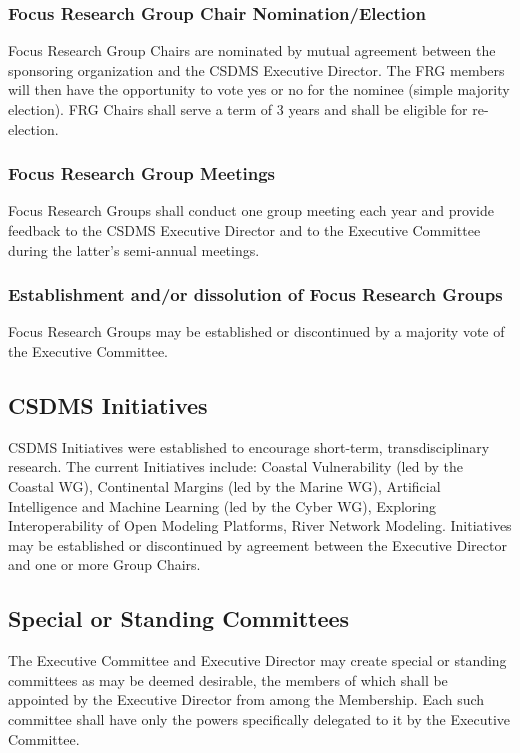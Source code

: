 \documentclass[11pt, oneside]{article}   	%
\begin{document}
\subsubsection{Focus Research Group Chair Nomination/Election}
Focus Research Group Chairs are nominated by mutual agreement between the sponsoring organization and the CSDMS Executive Director. The FRG members will then have the opportunity to vote yes or no for the nominee (simple majority election).  FRG Chairs shall serve a term of 3 years and shall be eligible for re-election.

\subsubsection{Focus Research Group Meetings}

Focus Research Groups shall conduct one group meeting each year and provide feedback to the CSDMS Executive Director and to the Executive Committee during the latter's semi-annual meetings.

\subsubsection{Establishment and/or dissolution of Focus Research Groups}

Focus Research Groups may be established or discontinued by a majority vote of the Executive Committee.  


\subsection{CSDMS Initiatives}

CSDMS Initiatives were established to encourage short-term, transdisciplinary research. The current Initiatives include: Coastal Vulnerability (led by the Coastal WG), Continental Margins (led by the Marine WG), Artificial Intelligence and Machine Learning (led by the Cyber WG), Exploring Interoperability of Open Modeling Platforms, River Network Modeling.  Initiatives may be established or discontinued by agreement between the Executive Director and one or more Group Chairs.


\subsection{Special or Standing Committees}

The Executive Committee and Executive Director may create special or standing committees as may be deemed desirable, the members of which shall be appointed by the Executive Director from among the Membership.  Each such committee shall have only the powers specifically delegated to it by the Executive Committee.
\end{document}
